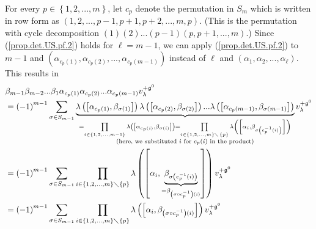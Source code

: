 \documentclass
[numbers=enddot,12pt,final,onecolumn,german,notitlepage]{scrartcl}%
\theoremstyle{definition}
\begin{document}
For every $p\in\left\{  1,2,...,m\right\}  $, let $c_{p}$ denote the
permutation in $S_{m}$ which is written in row form as $\left(
1,2,...,p-1,p+1,p+2,...,m,p\right)  $. (This is the permutation with cycle
decomposition $\left(  1\right)  \left(  2\right)  ...\left(  p-1\right)
\left(  p,p+1,...,m\right)  $.) Since (\ref{prop.det.US.pf.2}) holds for
$\ell=m-1$, we can apply (\ref{prop.det.US.pf.2}) to $m-1$ and $\left(
\alpha_{c_{p}\left(  1\right)  },\alpha_{c_{p}\left(  2\right)  }%
,...,\alpha_{c_{p}\left(  m-1\right)  }\right)  $ instead of $\ell$ and
$\left(  \alpha_{1},\alpha_{2},...,\alpha_{\ell}\right)  $. This results in%
\begin{align*}
&  \beta_{m-1}\beta_{m-2}...\beta_{1}\alpha_{c_{p}\left(  1\right)  }%
\alpha_{c_{p}\left(  2\right)  }...\alpha_{c_{p}\left(  m-1\right)
}v_{\lambda}^{+\mathfrak{g}^{0}}\\
&  =\left(  -1\right)  ^{m-1}\sum\limits_{\sigma\in S_{m-1}}%
\underbrace{\lambda\left(  \left[  \alpha_{c_{p}\left(  1\right)  }%
,\beta_{\sigma\left(  1\right)  }\right]  \right)  \lambda\left(  \left[
\alpha_{c_{p}\left(  2\right)  },\beta_{\sigma\left(  2\right)  }\right]
\right)  ...\lambda\left(  \left[  \alpha_{c_{p}\left(  m-1\right)  }%
,\beta_{\sigma\left(  m-1\right)  }\right]  \right)  }_{\substack{=\prod
\limits_{i\in\left\{  1,2,...,m-1\right\}  }\lambda\left(  \left[
\alpha_{c_{p}\left(  i\right)  },\beta_{\sigma\left(  i\right)  }\right]
\right)  =\prod\limits_{i\in\left\{  1,2,...,m\right\}  \diagdown\left\{
p\right\}  }\lambda\left(  \left[  \alpha_{i},\beta_{\sigma\left(  c_{p}%
^{-1}\left(  i\right)  \right)  }\right]  \right)  \\\text{(here, we
substituted }i\text{ for }c_{p}\left(  i\right)  \text{ in the product)}%
}}v_{\lambda}^{+\mathfrak{g}^{0}}\\
&  =\left(  -1\right)  ^{m-1}\sum\limits_{\sigma\in S_{m-1}}\prod
\limits_{i\in\left\{  1,2,...,m\right\}  \diagdown\left\{  p\right\}  }%
\lambda\left(  \left[  \alpha_{i},\underbrace{\beta_{\sigma\left(  c_{p}%
^{-1}\left(  i\right)  \right)  }}_{=\beta_{\left(  \sigma\circ c_{p}%
^{-1}\right)  \left(  i\right)  }}\right]  \right)  v_{\lambda}^{+\mathfrak{g}%
^{0}}\\
&  =\left(  -1\right)  ^{m-1}\sum\limits_{\sigma\in S_{m-1}}\prod
\limits_{i\in\left\{  1,2,...,m\right\}  \diagdown\left\{  p\right\}  }%
\lambda\left(  \left[  \alpha_{i},\beta_{\left(  \sigma\circ c_{p}%
^{-1}\right)  \left(  i\right)  }\right]  \right)  v_{\lambda}^{+\mathfrak{g}%
^{0}}\\

\end{align*}
\end{document}
